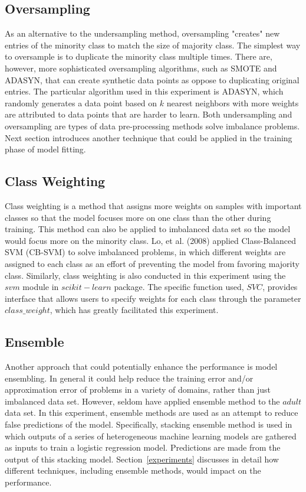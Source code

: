 \documentclass{article}
\begin{document}
\subsection{Oversampling}
\label{oversampling}

As an alternative to the undersampling method, oversampling "creates" new entries of the minority class to match the size of majority class. The simplest way to oversample is to duplicate the minority class multiple times. There are, however, more sophisticated oversampling algorithms, such as SMOTE and ADASYN, that can create synthetic data points as oppose to duplicating original entries. The particular algorithm used in this experiment is ADASYN, which randomly generates a data point based on $k$ nearest neighbors with more weights are attributed to data points that are harder to learn. Both undersampling and oversampling are types of data pre-processing methods solve imbalance problems. Next section introduces another technique that could be applied in the training phase of model fitting.

\subsection{Class Weighting}
\label{class_weighting}

Class weighting is a method that assigns more weights on samples with important classes so that the model focuses more on one class than the other during training. This method can also be applied to imbalanced data set so the model would focus more on the minority class. Lo, et al. (2008) applied Class-Balanced SVM (CB-SVM) to solve imbalanced problems, in which different weights are assigned to each class as an effort of preventing the model from favoring majority class. Similarly, class weighting is also conducted in this experiment using the $svm$ module in $scikit-learn$ package. The specific function used, $SVC$, provides interface that allows users to specify weights for each class through the parameter $class\_weight$, which has greatly facilitated this experiment.

\subsection{Ensemble}
\label{ensemble}

Another approach that could potentially enhance the performance is model ensembling. In general it could help reduce the training error and/or approximation error of problems in a variety of domains, rather than just imbalanced data set. However, seldom have applied ensemble method to the $adult$ data set. In this experiment, ensemble methods are used as an attempt to reduce false predictions of the model. Specifically, stacking ensemble method is used in which outputs of a series of heterogeneous machine learning models are gathered as inputs to train a logistic regression model. Predictions are made from the output of this stacking model. Section~\ref{experiments} discusses in detail how different techniques, including ensemble methods, would impact on the performance.
\end{document}

